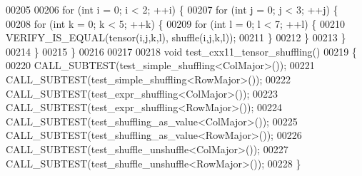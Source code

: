 \begin{DoxyCode}
00205 
00206   \textcolor{keywordflow}{for} (\textcolor{keywordtype}{int} i = 0; i < 2; ++i) \{
00207     \textcolor{keywordflow}{for} (\textcolor{keywordtype}{int} j = 0; j < 3; ++j) \{
00208       \textcolor{keywordflow}{for} (\textcolor{keywordtype}{int} k = 0; k < 5; ++k) \{
00209         \textcolor{keywordflow}{for} (\textcolor{keywordtype}{int} l = 0; l < 7; ++l) \{
00210           VERIFY\_IS\_EQUAL(tensor(i,j,k,l), shuffle(i,j,k,l));
00211         \}
00212       \}
00213     \}
00214   \}
00215 \}
00216 
00217 
00218 \textcolor{keywordtype}{void} test\_cxx11\_tensor\_shuffling()
00219 \{
00220   CALL\_SUBTEST(test\_simple\_shuffling<ColMajor>());
00221   CALL\_SUBTEST(test\_simple\_shuffling<RowMajor>());
00222   CALL\_SUBTEST(test\_expr\_shuffling<ColMajor>());
00223   CALL\_SUBTEST(test\_expr\_shuffling<RowMajor>());
00224   CALL\_SUBTEST(test\_shuffling\_as\_value<ColMajor>());
00225   CALL\_SUBTEST(test\_shuffling\_as\_value<RowMajor>());
00226   CALL\_SUBTEST(test\_shuffle\_unshuffle<ColMajor>());
00227   CALL\_SUBTEST(test\_shuffle\_unshuffle<RowMajor>());
00228 \}
\end{DoxyCode}
